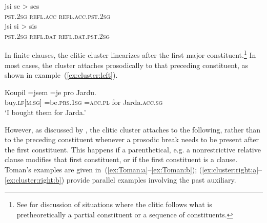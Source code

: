 \documentclass[output=paper]{langsci/langscibook}
\begin{document}
\begin{exe}
\ex\label{ex:fusion}\begin{xlist}
\ex\gll jsi se > ses\\
\textsc{pst.2sg} \textsc{refl.acc} {} \textsc{refl.acc.pst.2sg}\\ 
\ex\gll jsi si > sis\\
\textsc{pst.2sg} \textsc{refl.dat} {} \textsc{refl.dat.pst.2sg}\\ 
\end{xlist}
\end{exe}


In finite clauses, the clitic cluster linearizes after the first major constituent.\footnote{See \citet[98--114]{Hana07} for discussion of situations where the clitic follows what is pretheoretically a partial constituent or a sequence of constituents.} In most cases, the cluster attaches prosodically to that preceding constituent, as shown in example~(\ref{ex:cluster:left}).

\begin{exe}
\ex\label{ex:cluster:left}
\gll  Koupil =jsem =je pro Jardu.\\
buy.\textsc{lf[m.sg]} =be.\textsc{prs.1sg} =\textsc{acc.pl} for Jarda.\textsc{acc.sg}\\
\glt ‘I bought them for Jarda.’
\end{exe}

However, as discussed by \citet{Toman96}, the clitic cluster  attaches to the following, rather than to the preceding constituent whenever a prosodic break needs to be present after the first constituent. This happens if a parenthetical, e.g. a nonrestrictive relative clause modifies that first constituent, or if the first constituent is a clause. Toman's examples are given in~(\ref{ex:Toman:a}--\ref{ex:Toman:b}); (\ref{ex:cluster:right:a}--\ref{ex:cluster:right:b}) provide parallel examples involving the past auxiliary.
\end{document}

